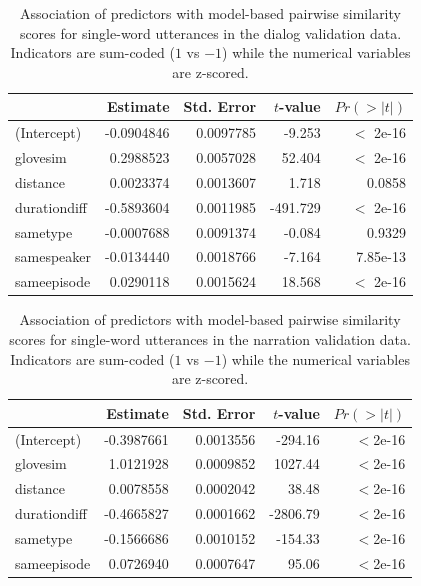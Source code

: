 \begin{table}
  \centering
  \begin{tabular}{lrrrr}\toprule
            &       Estimate & Std. Error  & $t$-value & $Pr(>|t|)$ \\    \midrule
(Intercept) &  -0.0904846    & 0.0097785   & -9.253  & $<$ 2e-16  \\
glovesim    &  0.2988523     & 0.0057028   & 52.404  & $<$ 2e-16  \\
distance    &  0.0023374     & 0.0013607   & 1.718   & 0.0858     \\  
durationdiff& -0.5893604     & 0.0011985   & -491.729& $<$ 2e-16  \\
sametype    & -0.0007688     & 0.0091374   & -0.084  & 0.9329   \\
samespeaker & -0.0134440     & 0.0018766   & -7.164  & 7.85e-13 \\
sameepisode &  0.0290118     & 0.0015624   & 18.568  & $<$ 2e-16  \\
\bottomrule
  \end{tabular}
  \caption{Association of predictors with model-based pairwise
  similarity scores for single-word utterances in the dialog
  validation data. Indicators are sum-coded ($1$ vs $-1$) while the
  numerical variables are z-scored.}
\label{tab:dialog-lm}
\end{table}

\begin{table}
  \centering
\begin{tabular}{lrrrr}\toprule
             &   Estimate    & Std. Error  & $t$-value & $Pr(>|t|)$\\\midrule
(Intercept)  & -0.3987661    & 0.0013556   & -294.16   & $<$2e-16 \\
glovesim     & 1.0121928     & 0.0009852   & 1027.44   & $<$2e-16 \\
distance     & 0.0078558     & 0.0002042   & 38.48     & $<$2e-16 \\
durationdiff & -0.4665827    & 0.0001662   & -2806.79  & $<$2e-16 \\
sametype     & -0.1566686    & 0.0010152   & -154.33   & $<$2e-16 \\
sameepisode  & 0.0726940     & 0.0007647   & 95.06     & $<$2e-16 \\
\end{tabular}
\caption{Association of predictors with model-based pairwise
  similarity scores for single-word utterances in the narration
  validation data. Indicators are sum-coded ($1$ vs $-1$) while the
  numerical variables are z-scored.}
\label{tab:narration-lm}
\end{table}